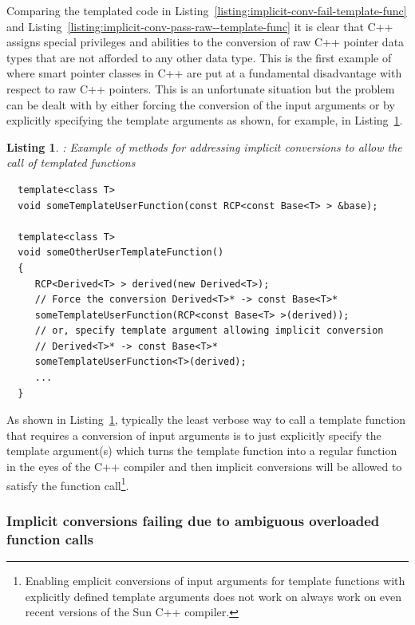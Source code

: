 \documentclass[pdf,ps2pdf,11pt]{SANDreport}
\newtheorem{listing}{Listing}
\begin{document}
Comparing the templated code in Listing~\ref{listing:implicit-conv-fail-template-func} and Listing~\ref{listing:implicit-conv-pass-raw--template-func} it is clear that
C++ assigns special privileges and abilities to the conversion of raw
C++ pointer data types that are not afforded to any other data type.
This is the first example of where smart pointer classes in C++ are
put at a fundamental disadvantage with respect to raw C++ pointers.
This is an unfortunate situation but the problem can be dealt with by
either forcing the conversion of the input arguments or by explicitly
specifying the template arguments as shown, for example, in Listing~\ref{listing:implicit-conv-pass-explicit-template-func}.


{}\begin{listing}: Example of methods for addressing implicit
conversions to allow the call of templated functions
\label{listing:implicit-conv-pass-explicit-template-func}
{\small\begin{verbatim}
  template<class T>
  void someTemplateUserFunction(const RCP<const Base<T> > &base);

  template<class T>
  void someOtherUserTemplateFunction()
  {
     RCP<Derived<T> > derived(new Derived<T>);
     // Force the conversion Derived<T>* -> const Base<T>*
     someTemplateUserFunction(RCP<const Base<T> >(derived));
     // or, specify template argument allowing implicit conversion
     // Derived<T>* -> const Base<T>*
     someTemplateUserFunction<T>(derived);
     ...
  }
\end{verbatim}}
\end{listing}


As shown in
Listing~\ref{listing:implicit-conv-pass-explicit-template-func},
typically the least verbose way to call a template function that
requires a conversion of input arguments is to just explicitly specify
the template argument(s) which turns the template function into a
regular function in the eyes of the C++ compiler and then implicit
conversions will be allowed to satisfy the function
call\footnote{Enabling emplicit conversions of input arguments for
template functions with explicitly defined template arguments does not
work on always work on even recent versions of the Sun C++ compiler.}.


%
{}\subsubsection*{Implicit conversions failing due to ambiguous
overloaded function calls}
%
\end{document}
